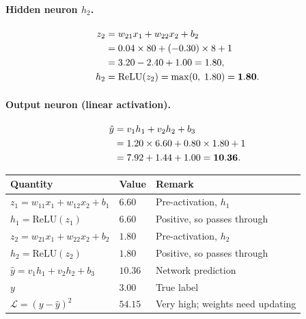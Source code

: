\documentclass[12pt,a4paper]{article}
\newcommand{\Loss}{\mathcal{L}}
\newcommand{\yhat}{\hat{y}}
\begin{document}
\paragraph{Hidden neuron $h_2$.}
\begin{align}
  z_2 &= w_{21}x_1 + w_{22}x_2 + b_2 \notag \\
      &= 0.04 \times 80 + (-0.30) \times 8 + 1 \notag \\
      &= 3.20 - 2.40 + 1.00 = 1.80, \\
  h_2 &= \mathrm{ReLU}(z_2) = \max(0,\;1.80) = \mathbf{1.80}.
  \label{eq:h2}
\end{align}

\paragraph{Output neuron (linear activation).}
\begin{align}
  \yhat &= v_1 h_1 + v_2 h_2 + b_3 \notag \\
        &= 1.20 \times 6.60 + 0.80 \times 1.80 + 1 \notag \\
        &= 7.92 + 1.44 + 1.00 = \mathbf{10.36}.
  \label{eq:yhat}
\end{align}

\begin{example}[title=Forward Pass Summary]
  \begin{center}
  \renewcommand{\arraystretch}{1.3}
  \begin{tabular}{lll}
    \toprule
    \textbf{Quantity} & \textbf{Value} & \textbf{Remark} \\
    \midrule
    $z_1 = w_{11}x_1 + w_{12}x_2 + b_1$ & $6.60$ & Pre-activation, $h_1$ \\
    $h_1 = \mathrm{ReLU}(z_1)$           & $6.60$ & Positive, so passes through \\
    $z_2 = w_{21}x_1 + w_{22}x_2 + b_2$ & $1.80$ & Pre-activation, $h_2$ \\
    $h_2 = \mathrm{ReLU}(z_2)$           & $1.80$ & Positive, so passes through \\
    $\yhat = v_1h_1 + v_2h_2 + b_3$      & $10.36$ & Network prediction \\
    $y$                                   & $3.00$  & True label \\
    $\Loss = (y - \yhat)^2$               & $54.15$ & Very high; weights need updating \\
    \bottomrule
  \end{tabular}
  \end{center}
\end{example}
\end{document}

